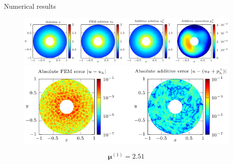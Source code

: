 \begin{frame}{Numerical results}
	\begin{figure}[!ht] \centering
		\includegraphics[width=\linewidth]{images/numeric/poisson/mixed/plots/standalone_solutions.pdf}
		
		\vspace{8pt}
		\includegraphics[width=0.7\linewidth]{images/numeric/poisson/mixed/plots/standalone_errors.pdf}
	\end{figure}

	\vspace{-8pt}
	$$\bm{\mu}^{(1)}=2.51 $$
\end{frame}